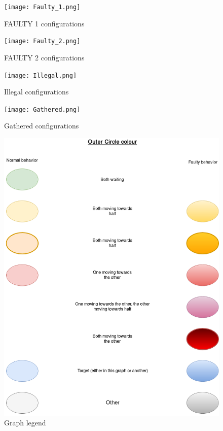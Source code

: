 \documentclass[11pt]{article}
\begin{document}
\begin{figure}[htb]
	\centering
	\texttt{[image: Faulty\_1.png]}
	\caption{FAULTY 1 configurations}
\end{figure}
\pagebreak

\begin{figure}[htb]
	\centering
	\texttt{[image: Faulty\_2.png]}
	\caption{FAULTY 2 configurations}
\end{figure}
\pagebreak

\begin{figure}[htb]
	\centering
	\texttt{[image: Illegal.png]}
	\caption{Illegal configurations}
\end{figure}
\pagebreak

\begin{figure}[htb]
	\centering
	\texttt{[image: Gathered.png]}
	\caption{Gathered configurations}
\end{figure}
\pagebreak

\begin{figure}[htb]
	\centering
	\includegraphics[scale=0.7]{Legend.png}
	\caption{Graph legend}
\end{figure}
\pagebreak
\end{document}
